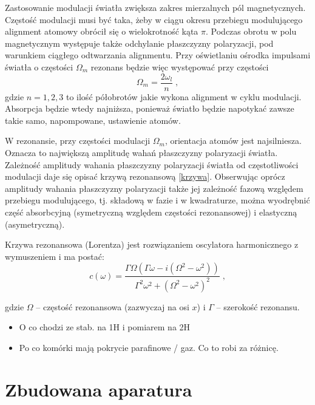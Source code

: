 \documentclass[a4paper,10pt]{article}
\begin{document}
 Zastosowanie modulacji światła zwiększa zakres mierzalnych pól magnetycznych. Częstość modulacji musi być taka, żeby w ciągu okresu przebiegu modulującego alignment atomowy obrócił się o wielokrotność kąta $\pi$. 
Podczas obrotu w polu magnetycznym występuje także odchylanie płaszczyzny polaryzacji, pod warunkiem ciągłego odtwarzania alignmentu. Przy oświetlaniu ośrodka impulsami światła o częstości $\Omega_m$ rezonans będzie więc występować przy częstości
\begin{equation}
\Omega_m=\frac{2 \omega_l}{n} \; ,
\end{equation}
gdzie $n=1,2,3$ to ilość półobrotów jakie wykona alignment w cyklu modulacji. Absorpcja będzie wtedy najniższa, ponieważ światło będzie napotykać zawsze takie samo, napompowane, ustawienie atomów.

W rezonansie, przy częstości modulacji $\Omega_m$, orientacja atomów jest najsilniesza. Oznacza to największą amplitudę wahań płaszczyzny polaryzacji światła. Zależność amplitudy wahania płaszczyzny polaryzacji światła
od częstotliwości modulacji daje się opisać krzywą rezonansową \ref{krzywa}. Obserwując oprócz amplitudy wahania płaszczyzny polaryzacji także jej zależność fazową względem przebiegu modulującego, tj. składową w fazie i w kwadraturze, można wyodrębnić część absorbcyjną (symetryczną względem częstości rezonansowej) i elastyczną (asymetryczną).

Krzywa rezonansowa (Lorentza) jest rozwiązaniem oscylatora harmonicznego z wymuszeniem i ma postać:
\begin{equation}
c(\omega)=\frac{\Gamma  \Omega  \left(\Gamma  \omega -i \left(\Omega ^2-\omega ^2\right)\right)}{\Gamma ^2 \omega ^2+\left(\Omega ^2-\omega ^2\right)^2} \; ,
\label{krzywa}
\end{equation}

gdzie $\Omega$ -- częstość rezonansowa (zazwyczaj na osi $x$) i $\Gamma$ -- szerokość rezonansu.\\

\begin{itemize}
 \item O co chodzi ze stab. na 1H i pomiarem na 2H
 \item Po co komórki mają pokrycie parafinowe / gaz. Co to robi za różnicę.
\end{itemize}


\pagebreak

\section{Zbudowana aparatura}
\end{document}
